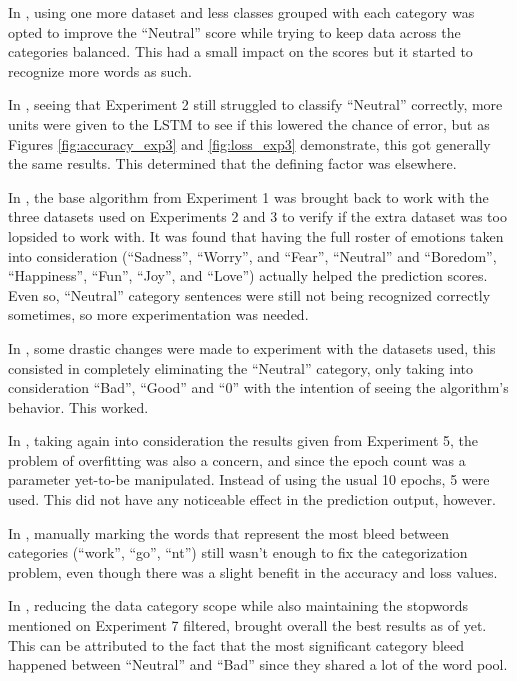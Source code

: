 In , using one more dataset and less classes grouped with each category was opted to improve the ``Neutral'' score while trying to keep data across the categories balanced. This had a small impact on the scores but it started to recognize more words as such.

In , seeing that Experiment 2 still struggled to classify ``Neutral'' correctly, more units were given to the LSTM to see if this lowered the chance of error, but as Figures \ref{fig:accuracy_exp3} and \ref{fig:loss_exp3} demonstrate, this got generally the same results. This determined that the defining factor was elsewhere.

In , the base algorithm from Experiment 1 was brought back to work with the three datasets used on Experiments 2 and 3 to verify if the extra dataset was too lopsided to work with. It was found that having the full roster of emotions taken into consideration (``Sadness'', ``Worry'', and ``Fear'', ``Neutral'' and ``Boredom'', ``Happiness'', ``Fun'', ``Joy'', and ``Love'') actually helped the prediction scores. Even so, ``Neutral'' category sentences were still not being recognized correctly sometimes, so more experimentation was needed.

In , some drastic changes were made to experiment with the datasets used, this consisted in completely eliminating the ``Neutral'' category, only taking into consideration ``Bad'', ``Good'' and ``0'' with the intention of seeing the algorithm's behavior. This worked. 

In , taking again into consideration the results given from Experiment 5, the problem of overfitting was also a concern, and since the epoch count was a parameter yet-to-be manipulated. Instead of using the usual 10 epochs, 5 were used. This did not have any noticeable effect in the prediction output, however.

In , manually marking the words that represent the most bleed between categories (``work'', ``go'', ``nt'') still wasn't enough to fix the categorization problem, even though there was a slight benefit in the accuracy and loss values.

In , reducing the data category scope while also maintaining the stopwords mentioned on Experiment 7 filtered, brought overall the best results as of yet. This can be attributed to the fact that the most significant category bleed happened between ``Neutral'' and ``Bad'' since they shared a lot of the word pool.

